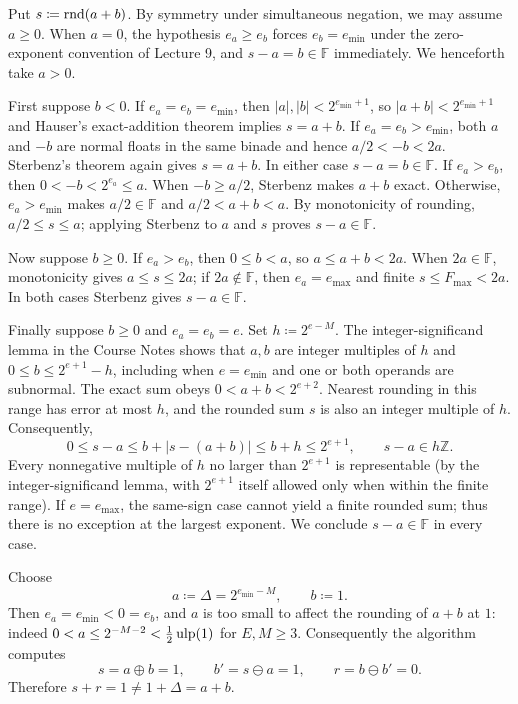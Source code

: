 \documentclass[11pt,oneside]{article}
\begin{document}
\begin{solution}
\begin{problemsubparts}
\item Put $s\coloneqq\operatorname{rnd}(a+b)$. By symmetry under simultaneous
negation, we may assume $a\ge0$. When $a=0$, the hypothesis
$e_a\ge e_b$ forces $e_b=e_{\min}$ under the zero-exponent
convention of Lecture 9, and $s-a=b\in\mathbb F$ immediately.
We henceforth take $a>0$.

First suppose $b<0$. If $e_a=e_b=e_{\min}$, then
$|a|, |b|<2^{e_{\min}+1}$, so
$|a+b|<2^{e_{\min}+1}$ and Hauser's exact-addition theorem
implies $s=a+b$. If $e_a=e_b>e_{\min}$, both $a$
and $-b$ are normal floats in the same binade and hence
$a/2<-b<2a$. Sterbenz's theorem again gives $s=a+b$.
In either case $s-a=b\in\mathbb F$.
If $e_a>e_b$, then $0<-b<2^{e_a}\le a$. When
$-b\ge a/2$, Sterbenz makes $a+b$ exact. Otherwise,
$e_a>e_{\min}$ makes $a/2\in\mathbb F$ and
$a/2<a+b<a$. By monotonicity of rounding,
$a/2\le s\le a$; applying Sterbenz to $a$ and $s$
proves $s-a\in\mathbb F$.

Now suppose $b\ge0$. If $e_a>e_b$, then $0\le b<a$,
so $a\le a+b<2a$. When $2a\in\mathbb F$, monotonicity
gives $a\le s\le2a$; if $2a\notin\mathbb F$, then
$e_a=e_{\max}$ and finite $s\le F_{\max}<2a$.
In both cases Sterbenz gives $s-a\in\mathbb F$.

Finally suppose $b\ge0$ and $e_a=e_b=e$. Set
$h\coloneqq2^{e-M}$. The integer-significand lemma in the
Course Notes shows that $a, b$ are integer multiples of $h$
and $0\le b\le2^{e+1}-h$, including when $e=e_{\min}$
and one or both operands are subnormal. The exact sum obeys
$0<a+b<2^{e+2}$. Nearest rounding in this range has error
at most $h$, and the rounded sum $s$ is also an integer
multiple of $h$. Consequently,
\[
 0\le s-a\le b+|s-(a+b)|\le b+h\le2^{e+1},
 \qquad s-a\in h\mathbb Z.
\]
Every nonnegative multiple of $h$ no larger than $2^{e+1}$
is representable (by the integer-significand lemma, with
$2^{e+1}$ itself allowed only when within the finite range).
If $e=e_{\max}$, the same-sign case cannot yield a finite
rounded sum; thus there is no exception at the largest
exponent. We conclude $s-a\in\mathbb F$ in every case.

\item Choose
\[
 a\coloneqq\Delta=2^{e_{\min}-M}, \qquad b\coloneqq1.
\]
Then $e_a=e_{\min}<0=e_b$, and $a$ is too small to affect
the rounding of $a+b$ at $1$: indeed
$0<a\le2^{-M-2}<\tfrac12\operatorname{ulp}(1)$ for $E, M\ge3$.
Consequently the algorithm computes
\[
 s=a\oplus b=1,
 \qquad b'=s\ominus a=1,
 \qquad r=b\ominus b'=0.
\]
Therefore $s+r=1\ne1+\Delta=a+b$.
\end{problemsubparts}
\end{solution}
\end{document}
